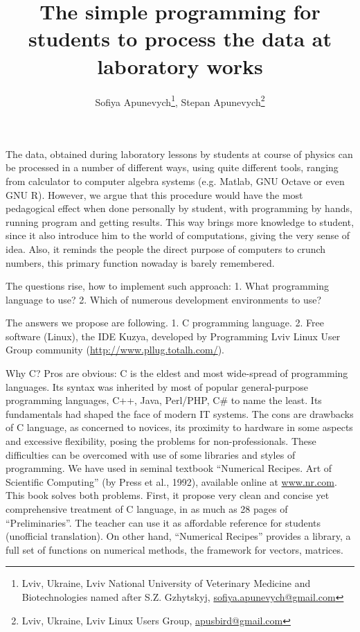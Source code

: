 \documentclass[10pt, a5paper]{article}
\begin{document}
\title{The simple programming for students to process the data at laboratory works}
\author{Sofiya Apunevych\footnote{Lviv, Ukraine, Lviv National University of Veterinary Medicine and Biotechnologies named after S.Z. Gzhytskyj, \url{sofiya.apunevych@gmail.com}}, Stepan Apunevych\footnote{Lviv, Ukraine, Lviv Linux Users Group, \url{apusbird@gmail.com}}}
\date{}
\maketitle

The data, obtained during laboratory lessons by students at course of physics can be processed in a number of different ways, using quite different tools, ranging from calculator to computer algebra systems (e.g. Matlab, GNU Octave or even GNU R). However, we argue that this procedure would have the most pedagogical effect when done \linebreak personally by student, with programming by hands, running program and getting results. This way brings more knowledge to student, since it also introduce him to the world of computations, giving the very sense of idea. Also, it reminds the people the direct purpose of computers to crunch numbers, this primary function nowaday is barely remembered.

The questions rise, how to implement such approach: 1. What \linebreak programming language to use? 2. Which of numerous development environments to use?

The answers we propose are following. 1. C programming language. 2. Free software (Linux), the IDE Kuzya, developed by Programming Lviv Linux User Group community (\url{http://www.pllug.totalh.com/}). 

Why C? Pros are obvious: C is the eldest and most wide-spread of programming languages. Its syntax was inherited by most of popular general-purpose programming languages, C++, Java, Perl/PHP, C\#  to name the least. Its fundamentals had shaped the face of modern IT systems. The cons are drawbacks of C language, as concerned to novices, its proximity to hardware in some aspects and excessive \linebreak  flexibility, posing the problems for non-professionals. These difficulties can be overcomed with use of some libraries and styles of programming. We have used in seminal textbook ``Numerical Recipes. Art of Scientific Computing'' (by Press et al., 1992), available online at \url{www.nr.com}. This book solves both problems. First, it propose very clean and  concise yet comprehensive treatment of C language, in as much as 28 pages of ``Preliminaries''. The teacher can use it as affordable reference for students (unofficial translation). On other hand, ``Numerical Recipes'' provides a library, a full set of functions on numerical methods, the framework for vectors, matrices.
\end{document}
